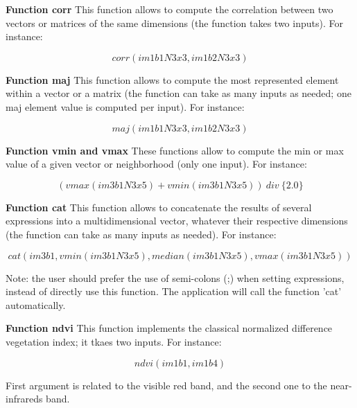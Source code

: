 \textbf{Function corr} \newline
This function allows to compute the correlation between two vectors or matrices of the same dimensions (the function takes two inputs). For instance:

\begin{equation}
	corr(im1b1N3x3,im1b2N3x3)
\end{equation}

\textbf{Function maj} \newline
This function allows to compute the most represented element within a vector or a matrix (the function can take
as many inputs as needed; one maj element value is computed per input). For instance:

\begin{equation}
	maj(im1b1N3x3,im1b2N3x3)
\end{equation}

\textbf{Function vmin and vmax} \newline
These functions allow to compute the min or max value of a given vector or neighborhood (only one input). For instance:

\begin{equation}
	(vmax(im3b1N3x5)+vmin(im3b1N3x5)) ~ div ~ \{2.0\}
\end{equation}

\textbf{Function cat} \newline
This function allows to concatenate the results of several expressions into a multidimensional vector, whatever their respective dimensions (the function can take
as many inputs as needed). For instance:

\begin{equation}
	cat(im3b1,vmin(im3b1N3x5),median(im3b1N3x5),vmax(im3b1N3x5))
\end{equation}

Note: the user should prefer the use of semi-colons (;) when setting expressions, instead of directly use this function.
The application will call the function 'cat' automatically.  


\textbf{Function ndvi} \newline
This function implements the classical normalized difference vegetation index; it tkaes two inputs. For instance:

\begin{equation}
	ndvi(im1b1,im1b4)
\end{equation}

First argument is related to the visible red band, and the second one to the near-infrareds band.

